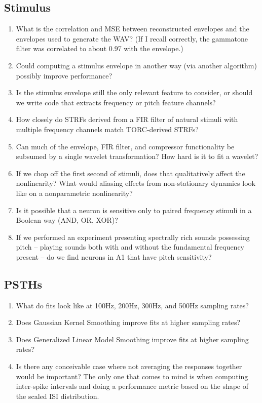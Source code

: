 \documentclass[11pt]{article}
\begin{document}
\subsection{Stimulus}
\label{sec-3.1}

\begin{enumerate}
\item What is the correlation and MSE between reconstructed envelopes and the envelopes used to generate the WAV? (If I recall correctly, the gammatone filter was correlated to about 0.97 with the envelope.)
\item Could computing a stimulus envelope in another way (via another algorithm) possibly improve performance?
\item Is the stimulus envelope still the only relevant feature to consider, or should we write code that extracts frequency or pitch feature channels?
\item How closely do STRFs derived from a FIR filter of natural stimuli with multiple frequency channels match TORC-derived STRFs?
\item Can much of the envelope, FIR filter, and compressor functionality be subsumed by a single wavelet transformation? How hard is it to fit a wavelet?
\item If we chop off the first second of stimuli, does that qualitatively affect the nonlinearity? What would aliasing effects from non-stationary dynamics look like on a nonparametric nonlinearity?
\item Is it possible that a neuron is sensitive only to paired frequency stimuli in a Boolean way (AND, OR, XOR)?
\item If we performed an experiment presenting spectrally rich sounds possessing pitch -- playing sounds both with and without the fundamental frequency present -- do we find neurons in A1 that have pitch sensitivity?
\end{enumerate}
\subsection{PSTHs}
\label{sec-3.2}

\begin{enumerate}
\item What do fits look like at 100Hz, 200Hz, 300Hz, and 500Hz sampling rates?
\item Does Gaussian Kernel Smoothing improve fits at higher sampling rates?
\item Does Generalized Linear Model Smoothing improve fits at higher sampling rates?
\item Is there any conceivable case where not averaging the responses together would be important? The only one that comes to mind is when computing inter-spike intervals and doing a performance metric based on the shape of the scaled ISI distribution.
\end{enumerate}
\end{document}
